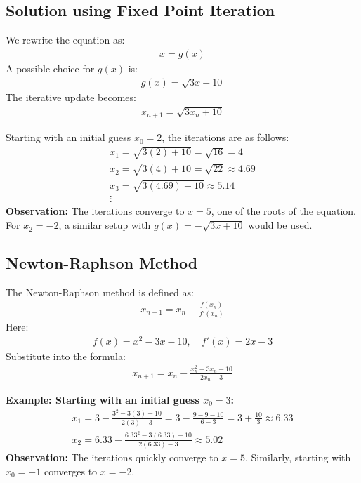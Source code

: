 \documentclass[journal]{IEEEtran}
\begin{document}
\subsection*{ Solution using Fixed Point Iteration}
We rewrite the equation as:
\begin{align}
    x = g(x)
\end{align}
A possible choice for \( g(x) \) is:
\begin{align}
    g(x) = \sqrt{3x + 10}
\end{align}
The iterative update becomes:
\begin{align}
    x_{n+1} = \sqrt{3x_n + 10}
\end{align}

Starting with an initial guess \( x_0 = 2 \), the iterations are as follows:
\begin{align}
    x_1 = \sqrt{3(2) + 10} = \sqrt{16} = 4 \\
    x_2 = \sqrt{3(4) + 10} = \sqrt{22} \approx 4.69 \\
    x_3 = \sqrt{3(4.69) + 10} \approx 5.14 \\
    \vdots
\end{align}
\textbf{Observation:} The iterations converge to \( x = 5 \), one of the roots of the equation. For \( x_2 = -2 \), a similar setup with \( g(x) = -\sqrt{3x + 10} \) would be used.

\subsection*{ Newton-Raphson Method}
The Newton-Raphson method is defined as:
\begin{align}
    x_{n+1} = x_n - \frac{f(x_n)}{f'(x_n)}
\end{align}
Here:
\begin{align}
    f(x) = x^2 - 3x - 10, \quad f'(x) = 2x - 3
\end{align}
Substitute into the formula:
\begin{align}
    x_{n+1} = x_n - \frac{x_n^2 - 3x_n - 10}{2x_n - 3}
\end{align}

\textbf{Example: Starting with an initial guess \( x_0 = 3 \):}
\begin{align}
    x_1 = 3 - \frac{3^2 - 3(3) - 10}{2(3) - 3} = 3 - \frac{9 - 9 - 10}{6 - 3} = 3 + \frac{10}{3} \approx 6.33 \\
    x_2 = 6.33 - \frac{6.33^2 - 3(6.33) - 10}{2(6.33) - 3} \approx 5.02
\end{align}
\textbf{Observation:} The iterations quickly converge to \( x = 5 \). Similarly, starting with \( x_0 = -1 \) converges to \( x = -2 \).
\end{document}
